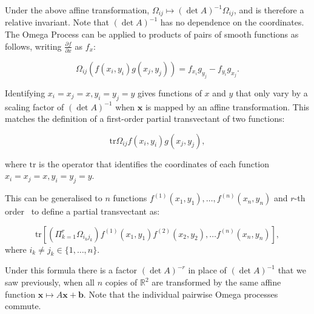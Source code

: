 \documentclass[review,onefignum,onetabnum]{siamonline190516}
\begin{document}
Under the above affine transformation, $\Omega_{ij} \mapsto (\det A)^{-1}
\Omega_{ij}$, and is therefore a relative invariant. Note that $(\det A)^{-1}$ has no dependence on the coordinates.
The Omega Process can be applied to products of pairs of smooth functions as follows,
writing $\frac{\partial f}{\partial x}$ as $f_x$:

\begin{equation}
\Omega_{ij} \left(f(x_i, y_i) g(x_j, y_j)\right) = f_{x_i}g_{y_j} - f_{y_i}g_{x_j}.
\end{equation}

Identifying $x_i = x_j = x, y_i = y_j = y$ gives functions of $x$ and $y$
that only vary by a scaling factor of $(\det A)^{-1}$ when $\mathbf{x}$ is
mapped by an affine transformation. This matches the definition of a
first-order partial transvectant of two functions:

\begin{equation}
\mbox{tr} \Omega_{ij} f(x_i, y_i) g(x_j, y_j),
\end{equation}

\noindent where $\mbox{tr}$  is the operator that identifies the coordinates of each function $x_i = x_j = x, y_i = y_j = y$.

This can be generalised to $n$ functions $f^{(1)}(x_1, y_1), \ldots, f^{(n)}(x_n, y_n)$ and $r$-th order~\citep{OlverEIS} to define a partial transvectant as:

\begin{equation}
\mbox{tr} \left[\left( \Pi_{k=1}^r \Omega_{i_k j_k} \right) f^{(1)}(x_1, y_1)
f^{(2)}(x_2, y_2), \ldots f^{(n)} (x_n, y_n)\right],
\end{equation}
where $i_k \neq j_k \in \{1, \ldots, n\}$.

Under this formula there is a factor $(\det A)^{-r}$ in place of $(\det
A)^{-1}$ that we saw previously, when all $n$ copies of $\mathbb{R}^2$ are
transformed by the same affine function $\mathbf{x} \mapsto A\mathbf{x} +
\mathbf{b}$. Note that the individual pairwise Omega processes commute.
\end{document}
